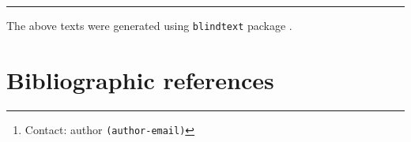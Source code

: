 \singlespacing
\title{\vspace{-\baselineskip}}
\author[]{Author name\footnote{Contact: author \texttt{(author-email)}}} 
\date{}
\maketitle
\vspace{-\baselineskip} \hrule


\setcounter{page}{1}

\blinddocument

The above texts were generated using \texttt{blindtext} package \cite{dirac}.


\section*{Bibliographic references}
\printbibliography[notcategory=fullcited,heading=none]



